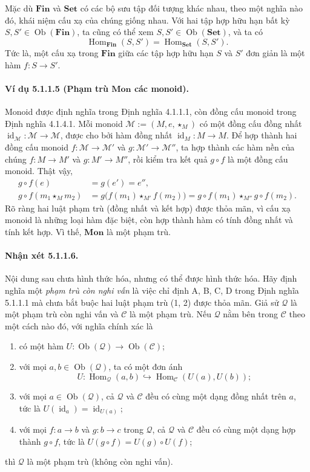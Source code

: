 Mặc dù $\mathbf{Fin}$ và $\mathbf{Set}$ có các bộ sưu tập đối tượng khác nhau, theo một nghĩa nào đó, khái niệm cấu xạ của chúng giống nhau. Với hai tập hợp hữu hạn bất kỳ $S,S'\in\operatorname{Ob}(\mathbf{Fin})$, ta cũng có thể xem $S,S'\in\operatorname{Ob}(\mathbf{Set})$, và ta có
\[\operatorname{Hom}_{\mathbf{Fin}}(S,S')=\operatorname{Hom}_{\mathbf{Set}}(S,S').\]
Tức là, một cấu xạ trong $\mathbf{Fin}$ giữa các tập hợp hữu hạn $S$ và $S'$ đơn giản là một hàm $f:S\to S'$.
\paragraph{Ví dụ 5.1.1.5 (Phạm trù $\mathbf{Mon}$ các monoid).} Monoid được định nghĩa trong Định nghĩa 4.1.1.1, còn đồng cấu monoid trong Định nghĩa 4.1.4.1. Mỗi monoid $\mathcal M:=(M,e,\star_M)$
có một đồng cấu đồng nhất $\operatorname{id}_{\mathcal M}:\mathcal M\to\mathcal M$, được cho bởi hàm đồng nhất $\operatorname{id}_M:M\to M$. Để hợp thành hai đồng cấu monoid $f:\mathcal M\to\mathcal M'$ và $g:\mathcal M'\to\mathcal M''$, ta hợp thành các hàm nền của chúng $f:M\to M'$ và $g:M'\to M''$, rồi kiểm tra kết quả $g\circ f$ là một đồng cấu monoid. Thật vậy,
\begin{align*}
g\circ f(e)&=g(e')=e'',\\
g\circ f(m_1\star_M m_2)&=g\bigl(f(m_1)\star_{M'}f(m_2)\bigr)=g\circ f(m_1)\star_{M''}g\circ f(m_2).
\end{align*}
Rõ ràng hai luật phạm trù (đồng nhất và kết hợp) được thỏa mãn, vì cấu xạ monoid là những loại hàm đặc biệt, còn hợp thành hàm có tính đồng nhất và tính kết hợp. Vì thế, $\mathbf{Mon}$ là một phạm trù.
\paragraph{Nhận xét 5.1.1.6.} Nội dung sau chưa hình thức hóa, nhưng có thể được hình thức hóa. Hãy định nghĩa một \emph{phạm trù còn nghi vấn} là việc chỉ định A, B, C, D trong Định nghĩa 5.1.1.1 mà chưa bắt buộc hai luật phạm trù (1, 2) được thỏa mãn. Giả sử $\mathcal Q$ là một phạm trù còn nghi vấn và $\mathcal C$ là một phạm trù. Nếu $\mathcal Q$ nằm bên trong $\mathcal C$ theo một cách nào đó, với nghĩa chính xác là
\begin{enumerate}[label=\Alph*.]
\item có một hàm $U:\operatorname{Ob}(\mathcal Q)\to\operatorname{Ob}(\mathcal C)$;
\item với mọi $a,b\in\operatorname{Ob}(\mathcal Q)$, ta có một đơn ánh
\[U:\operatorname{Hom}_{\mathcal Q}(a,b)\hookrightarrow\operatorname{Hom}_{\mathcal C}(U(a),U(b));\]
\item với mọi $a\in\operatorname{Ob}(\mathcal Q)$, cả $\mathcal Q$ và $\mathcal C$ đều có cùng một dạng đồng nhất trên $a$, tức là $U(\operatorname{id}_a)=\operatorname{id}_{U(a)}$;
\item với mọi $f:a\to b$ và $g:b\to c$ trong $\mathcal Q$, cả $\mathcal Q$ và $\mathcal C$ đều có cùng một dạng hợp thành $g\circ f$, tức là $U(g\circ f)=U(g)\circ U(f)$;
\end{enumerate}
thì $\mathcal Q$ là một phạm trù (không còn nghi vấn).

